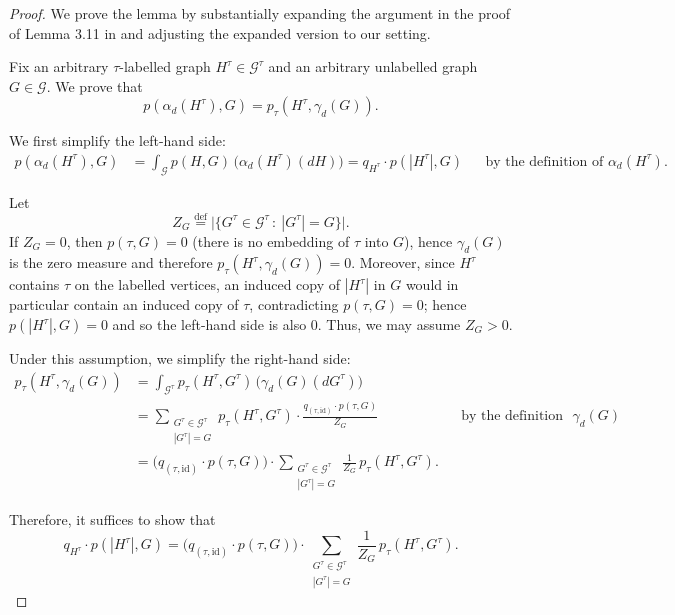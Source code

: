 \documentclass{article}
\newcommand*{\defeq}{\stackrel{\mathrm{def}}{=}}
\begin{document}
\begin{proof}
  We prove the lemma by substantially expanding the argument in the proof of Lemma 3.11 in \cite{Razborov2007} and adjusting the expanded version to our setting.

  Fix an arbitrary $\tau$-labelled graph $H^\tau \in \mathcal{G}^\tau$ and an arbitrary unlabelled
  graph $G \in \mathcal{G}$. We prove that
  \[
    p(\alpha_d(H^\tau), G) = p_\tau(H^\tau, \gamma_d(G)).
  \]

  We first simplify the left-hand side:
  \begin{align*}
    p(\alpha_d(H^\tau), G)
    & = \int_{\mathcal{G}} p(H, G) \, \big(\alpha_d(H^\tau)(dH)\big)
    = q_{H^\tau} \cdot p(|H^\tau|, G)
    && \text{by the definition of } \alpha_d(H^\tau).
  \end{align*}

  Let
  \[
    Z_G \defeq \big|\{G^\tau \in \mathcal{G}^\tau \,:\ |G^\tau| = G\}\big|.
  \]
  If $Z_G = 0$, then $p(\tau,G)=0$ (there is no embedding of $\tau$ into $G$), hence $\gamma_d(G)$ is
  the zero measure and therefore $p_\tau(H^\tau,\gamma_d(G))=0$.
  Moreover, since $H^\tau$ contains $\tau$ on the labelled vertices, an induced copy of $|H^\tau|$ in
  $G$ would in particular contain an induced copy of $\tau$, contradicting $p(\tau,G)=0$; hence
  $p(|H^\tau|,G)=0$ and so the left-hand side is also $0$.
  Thus, we may assume $Z_G>0$.

  Under this assumption, we simplify the right-hand side:
  \begin{align*}
    p_\tau(H^\tau, \gamma_d(G))
    & = \int_{\mathcal{G}^\tau} p_\tau(H^\tau, G^\tau) \, \big(\gamma_d(G)(dG^\tau)\big)
    \\
    & = \sum_{\substack{G^\tau \in \mathcal{G}^\tau \\ |G^\tau| = G}}
    p_\tau(H^\tau, G^\tau)\cdot \frac{q_{(\tau,\mathrm{id})}\cdot p(\tau,G)}{Z_G}
    && \text{by the definition of } \gamma_d(G)
    \\
    & = \big(q_{(\tau,\mathrm{id})}\cdot p(\tau,G)\big)\cdot
    \sum_{\substack{G^\tau \in \mathcal{G}^\tau \\ |G^\tau| = G}}
    \frac{1}{Z_G}\,p_\tau(H^\tau, G^\tau).
  \end{align*}

  Therefore, it suffices to show that
  \begin{equation}
    \label{eq:downward-adjoint:target-eq}
    q_{H^\tau} \cdot p(|H^\tau|, G)
    =
    \big(q_{(\tau,\mathrm{id})} \cdot p(\tau,G)\big)\cdot
    \sum_{\substack{G^\tau \in \mathcal{G}^\tau \\ |G^\tau| = G}}
    \frac{1}{Z_G}\,p_\tau(H^\tau, G^\tau).
  \end{equation}


\end{proof}
\end{document}
